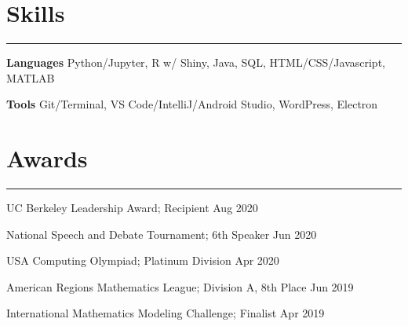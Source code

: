 \documentclass[11pt]{article}
\newcommand{\resumesection}[1]{\vspace{-0.3cm}\section*{\color{highlight}#1}\vspace{-0.3cm}\hrule\vspace{0.3cm}}
\begin{document}
\resumesection{Skills}

\textbf{Languages} Python/Jupyter, R w/ Shiny, Java, SQL, HTML/CSS/Javascript, MATLAB\par
\textbf{Tools} Git/Terminal, VS Code/IntelliJ/Android Studio, WordPress, Electron

\resumesection{Awards}

UC Berkeley Leadership Award; Recipient \hfill Aug 2020 \par
National Speech and Debate Tournament; 6th Speaker \hfill Jun 2020 \par
USA Computing Olympiad; Platinum Division \hfill Apr 2020 \par
American Regions Mathematics League; Division A, 8th Place \hfill Jun 2019 \par
International Mathematics Modeling Challenge; Finalist \hfill Apr 2019\par
\end{document}
